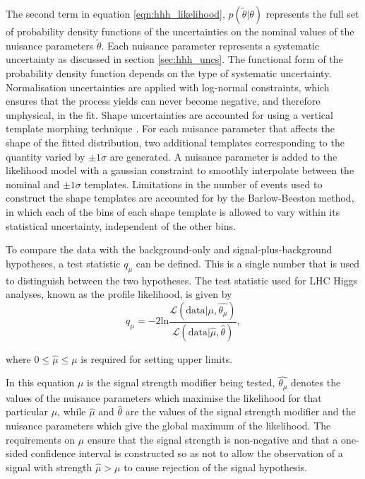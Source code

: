 The second term in equation \ref{eqn:hhh_likelihood}, $p(\tilde{\theta}|\theta)$ represents the full set of 
probability density functions of the uncertainties on the nominal
values of the nuisance parameters $\tilde{\theta}$. Each nuisance parameter represents a systematic uncertainty
as discussed in section \ref{sec:hhh_uncs}. The functional form of the probability density function
depends on the type of systematic uncertainty. Normalisation uncertainties are applied with log-normal constraints, which
ensures that the process yields can never become negative, and therefore unphysical, in the fit. 
Shape uncertainties are accounted for using a vertical template morphing
technique \cite{temp-morph-2011}. For each nuisance parameter that affects the shape of the fitted distribution, two additional
templates corresponding to the quantity varied by $\pm 1 \sigma$ are generated. A nuisance
parameter is added to the likelihood model with a gaussian constraint to smoothly interpolate between
the nominal and $\pm 1\sigma$ templates. Limitations in the number of events used to construct the shape templates
are accounted for by the Barlow-Beeston method\cite{BarlowBeeston}, in which each of the bins of each 
shape template is allowed to vary within its statistical uncertainty, independent of the other bins. %

To compare the data with the background-only and signal-plus-background hypotheses, a test
statistic $q_{\mu}$ can be defined. This is a single 
number that is used to distinguish between the two hypotheses. The test
statistic used for LHC Higgs analyses, known as the profile likelihood, is given 
by
\begin{equation}\label{eqn:hhh_profilelikelihood}
q_{\mu} = -2\text{ln}\frac{\mathcal{L}(\text{data}|\mu,\hat{\theta_{\mu}})}{\mathcal{L}(\text{data}|\hat{\mu},\hat{\theta})},
\end{equation}

where $0 \leq \hat{\mu} \leq \mu$ is required for setting upper limits.

In this equation $\mu$ is the signal strength modifier being tested, $\hat{\theta_{\mu}}$ denotes the values of the
nuisance parameters which maximise the likelihood for that particular $\mu$, while $\hat{\mu}$ and $\hat{\theta}$ are
the values of the signal strength modifier and the nuisance parameters which give the global maximum of the likelihood.
The requirements on $\mu$ ensure that the signal strength is non-negative and that
a one-sided confidence interval is constructed so as not to allow the observation of  a 
signal with strength $\hat{\mu} > \mu$ to cause rejection of the signal hypothesis.

